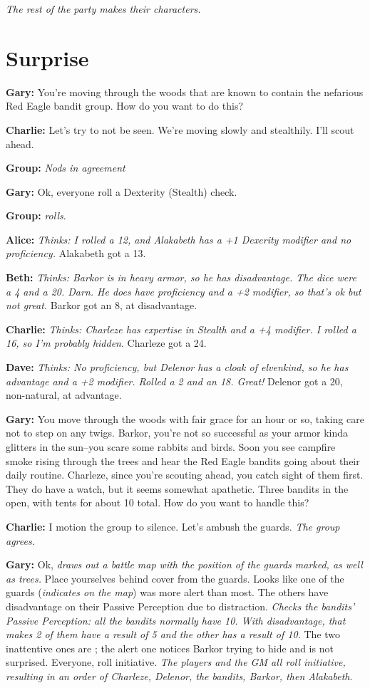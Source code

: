 \textit{The rest of the party makes their characters.}

\section{Surprise}\label{example:surprise}
\textbf{Gary:} You're moving through the woods that are known to contain the nefarious Red Eagle bandit group. How do you want to do this?

\textbf{Charlie:} Let's try to not be seen. We're moving slowly and stealthily. I'll scout ahead. 

\textbf{Group:} \textit{Nods in agreement}

\textbf{Gary:} Ok, everyone roll a Dexterity (Stealth) check.

\textbf{Group:} \textit{rolls}.

\textbf{Alice:} \textit{Thinks: I rolled a 12, and Alakabeth has a +1 Dexerity modifier and no proficiency.} Alakabeth got a 13.

\textbf{Beth:} \textit{Thinks: Barkor is in heavy armor, so he has disadvantage. The dice were a 4 and a 20. Darn. He does have proficiency and a +2 modifier, so that's ok but not great.} Barkor got an 8, at disadvantage.

\textbf{Charlie:} \textit{Thinks: Charleze has expertise in Stealth and a +4 modifier. I rolled a 16, so I'm probably hidden}. Charleze got a 24.

\textbf{Dave:} \textit{Thinks: No proficiency, but Delenor has a cloak of elvenkind, so he has advantage and a +2 modifier. Rolled a 2 and an 18. Great!} Delenor got a 20, non-natural, at advantage.

\textbf{Gary:} You move through the woods with fair grace for an hour or so, taking care not to step on any twigs. Barkor, you're not so successful as your armor kinda glitters in the sun--you scare some rabbits and birds. Soon you see campfire smoke rising through the trees and hear the Red Eagle bandits going about their daily routine. Charleze, since you're scouting ahead, you catch sight of them first. They do have a watch, but it seems somewhat apathetic. Three bandits in the open, with tents for about 10 total. How do you want to handle this?

\textbf{Charlie:} I motion the group to silence. Let's ambush the guards. \textit{The group agrees.}

\textbf{Gary:} Ok, \textit{draws out a battle map with the position of the guards marked, as well as trees.} Place yourselves behind cover from the guards. Looks like one of the guards (\textit{indicates on the map}) was more alert than most. The others have disadvantage on their Passive Perception due to distraction. \textit{Checks the bandits' Passive Perception: all the bandits normally have 10. With disadvantage, that makes 2 of them have a result of 5 and the other has a result of 10.} The two inattentive ones are ; the alert one notices Barkor trying to hide and is not surprised. Everyone, roll initiative. \textit{The players and the GM all roll initiative, resulting in an order of Charleze, Delenor, the bandits, Barkor, then Alakabeth}.

